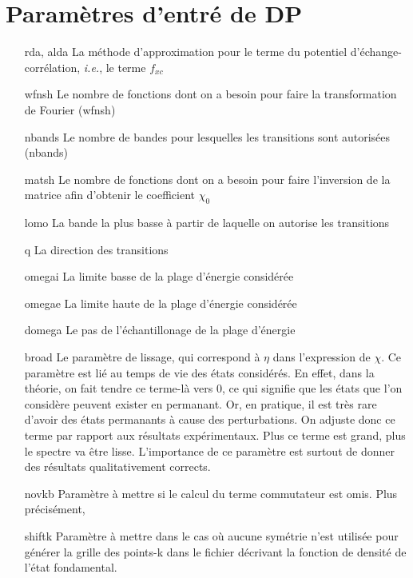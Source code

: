 \documentclass[12pt, french]{report}
\theoremstyle{theoreme}
\begin{document}
\section{Paramètres d'entré de DP}
\begin{itemize}[leftmargin=0em, font=\bfseries]
\item[rda, alda] La méthode d'approximation pour le terme du potentiel d'échange-corrélation, \textit{i.e.}, le terme $f_{xc}$ %
\item[wfnsh] Le nombre de fonctions dont on a besoin pour faire la transformation de Fourier (wfnsh)%
\item[nbands] Le nombre de bandes pour lesquelles les transitions sont autorisées (nbands)
\item[matsh] Le nombre de fonctions dont on a besoin pour faire l'inversion de la matrice afin d'obtenir le coefficient $\chi_0$
\item[lomo] La bande la plus basse à partir de laquelle on autorise les transitions
\item[q] La direction des transitions
\item[omegai] La limite basse de la plage d'énergie considérée
\item[omegae] La limite haute de la plage d'énergie considérée
\item[domega] Le pas de l'échantillonage de la plage d'énergie
\item[broad] Le paramètre de lissage, qui correspond à $\eta$ dans l'expression de $\chi$. Ce paramètre est lié au temps de vie des états considérés. En effet, dans la théorie, on fait tendre ce terme-là vers 0, ce qui signifie que les états que l'on considère peuvent exister en permanant. Or, en pratique, il est très rare d'avoir des états permanants à cause des perturbations. On adjuste donc ce terme par rapport aux résultats expérimentaux. Plus ce terme est grand, plus le spectre va être lisse. L'importance de ce paramètre est surtout de donner des résultats qualitativement corrects.
\item[novkb] Paramètre à mettre si le calcul du terme commutateur est omis. Plus précisément, %
\item[shiftk] Paramètre à mettre dans le cas où aucune symétrie n'est utilisée pour générer la grille des points-k dans le fichier décrivant la fonction de densité de l'état fondamental.
\end{itemize}
\end{document}
